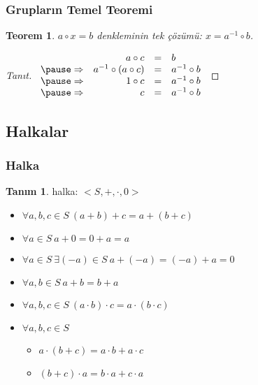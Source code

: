 \documentclass[dvipsnames]{beamer}
\theoremstyle{definition}
\newtheorem{tanim}[theorem]{Tanım}
\theoremstyle{example}
\theoremstyle{plain}
\newtheorem{teorem}[theorem]{Teorem}
\begin{document}
\begin{frame}
  \frametitle{Grupların Temel Teoremi}

  \begin{teorem}
    $a \circ x = b$ denkleminin tek çözümü: $x = a^{-1} \circ b$.
  \end{teorem}

  \pause
  \begin{proof}[Tanıt]
    $\begin{array}{crcl}
                & a \circ c                & = & b\\\pause
    \Rightarrow & a^{-1} \circ (a \circ c) & = & a^{-1} \circ b\\\pause
    \Rightarrow & 1 \circ c                & = & a^{-1} \circ b\\\pause
    \Rightarrow & c                        & = & a^{-1} \circ b
    \end{array}$
  \end{proof}
\end{frame}

\subsection{Halkalar}

\begin{frame}
  \frametitle{Halka}

  \begin{tanim}
    \alert{halka}: $<S,+,\cdot,0>$

    \begin{itemize}
      \item $\forall a,b,c \in S~(a + b) + c = a + (b + c)$
      \item $\forall a \in S~a + 0 = 0 + a = a$
      \item $\forall a \in S~\exists (-a) \in S~a + (-a) = (-a) + a = 0$
      \item $\forall a,b \in S~a + b = b + a$

      \pause
      \item $\forall a,b,c \in S~(a \cdot b) \cdot c = a \cdot (b \cdot c)$

      \pause
      \item $\forall a,b,c \in S$
      \begin{itemize}
        \item $a \cdot (b + c) = a \cdot b + a \cdot c$
        \item $(b + c) \cdot a = b \cdot a + c \cdot a$
      \end{itemize}
    \end{itemize}
  \end{tanim}
\end{frame}
\end{document}
